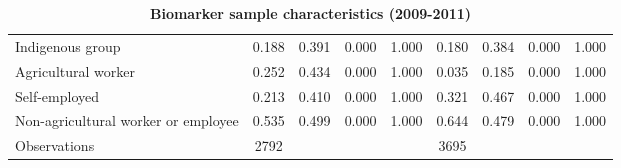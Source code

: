 \begin{table}[h!]
\begin{center}
{\begin{tabular}{l*{2}{cccc}}
Indigenous group    &       0.188&       0.391&       0.000&       1.000&       0.180&       0.384&       0.000&       1.000\\
Agricultural worker &       0.252&       0.434&       0.000&       1.000&       0.035&       0.185&       0.000&       1.000\\
Self-employed       &       0.213&       0.410&       0.000&       1.000&       0.321&       0.467&       0.000&       1.000\\
Non-agricultural worker or employee&       0.535&       0.499&       0.000&       1.000&       0.644&       0.479&       0.000&       1.000\\
\midrule
Observations        &        2792&            &            &            &        3695&            &            &            \\
\bottomrule
\end{tabular} }
\caption{\label{tab:Biomarker-sample-characteristics}\textbf{Biomarker sample characteristics
(2009-2011) }}
\end{center}
\end{table}  
  
  
  
  
  
  
  
  
  
  
  
  
  
  
  
  
  
  
  
  
  
  
  
  
  
  
  
  